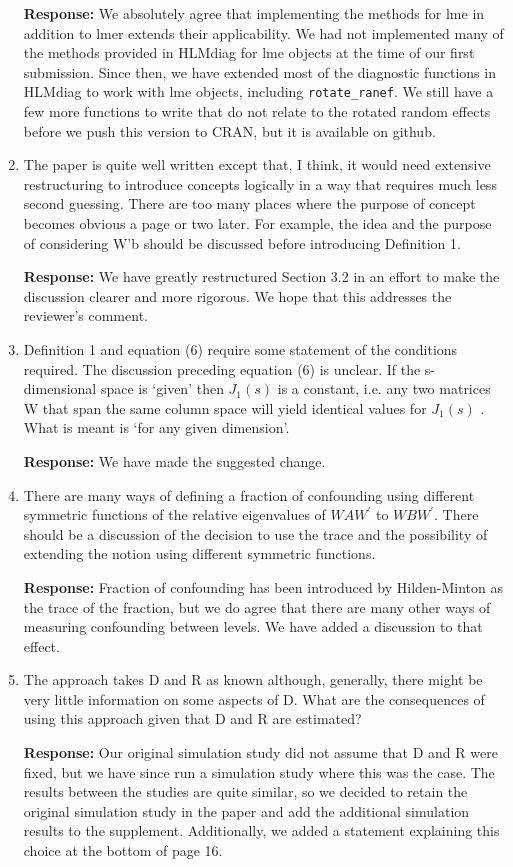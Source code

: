 \documentclass[11pt]{article}
\begin{document}
\begin{enumerate}
\textbf{Response:} We absolutely agree that implementing the methods for lme in addition to lmer extends their applicability. We had not implemented many of the methods provided in HLMdiag for lme objects at the time of our first submission. Since then, we have extended most of the diagnostic functions in HLMdiag to work with lme objects, including \verb=rotate_ranef=. We still have a few more functions to write that do not relate to the rotated random effects before we push this version to CRAN, but it is available on github.

\item The paper is quite well written except that, I think, it would need extensive restructuring to introduce concepts logically in a way that requires much less second guessing. There are too many places where the purpose of concept becomes obvious a page or two later. For example, the idea and the purpose of considering W'b should be discussed before introducing Definition 1.

\textbf{Response:} We have greatly restructured Section 3.2 in an effort to make the discussion clearer and more rigorous. We hope that this addresses the reviewer's comment.


\item Definition 1 and equation (6) require some statement of the conditions required. The
discussion preceding equation (6) is unclear. If the s-dimensional space is `given' then $J_1 (s)$ is a constant, i.e. any two matrices W that span the same column space will yield
identical values for $J_1 (s)$ . What is meant is `for any given dimension'.

\textbf{Response:} We have made the suggested change.

\item There are many ways of defining a fraction of confounding using different symmetric functions of the relative eigenvalues of $WAW^\prime$ to $WBW^\prime$. There should be a discussion of the decision to use the trace and the possibility of extending the notion using different symmetric functions.

\textbf{Response:} Fraction of confounding has been introduced by Hilden-Minton as the trace of the fraction, but we do agree that there are many other ways of measuring confounding between levels. We have added a discussion to that effect.

\item The approach takes D and R as known although, generally, there might be very little information on some aspects of D. What are the consequences of using this approach given that D and R are estimated?

\textbf{Response:} Our original simulation study did not assume that D and R were fixed, but we have since run a simulation study where this was the case. The results between the studies are quite similar, so we decided to retain the original simulation study in the paper and add the additional simulation results to the supplement. Additionally, we added a statement explaining this choice at the bottom of page 16.


\end{enumerate}
\end{document}
